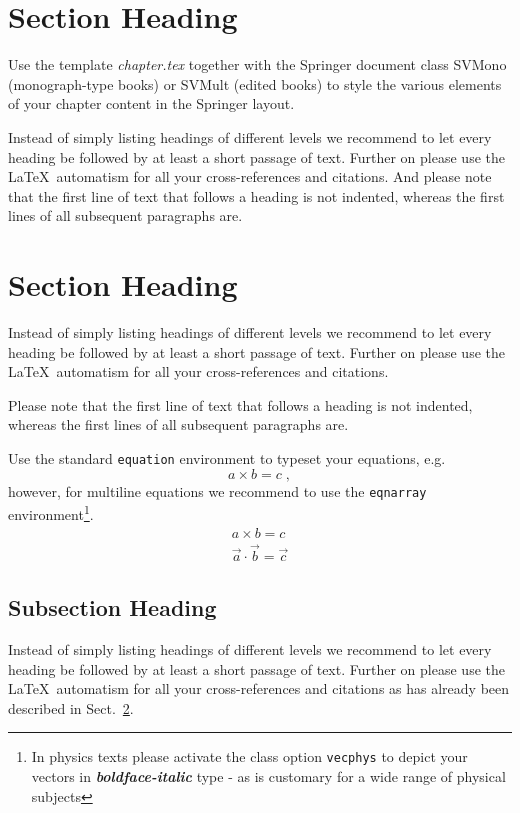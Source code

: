 \documentclass[graybox]{svmult}
\begin{document}
\section{Section Heading}
\label{sec:1}
Use the template \emph{chapter.tex} together with the Springer document class SVMono (monograph-type books) or SVMult (edited books) to style the various elements of your chapter content in the Springer layout.

Instead of simply listing headings of different levels we recommend to
let every heading be followed by at least a short passage of text.
Further on please use the \LaTeX\ automatism for all your
cross-references and citations. And please note that the first line of
text that follows a heading is not indented, whereas the first lines of
all subsequent paragraphs are.

\section{Section Heading}
\label{sec:2}
Instead of simply listing headings of different levels we recommend to
let every heading be followed by at least a short passage of text.
Further on please use the \LaTeX\ automatism for all your
cross-references and citations.

Please note that the first line of text that follows a heading is not indented, whereas the first lines of all subsequent paragraphs are.

Use the standard \verb|equation| environment to typeset your equations, e.g.
%
\begin{equation}
a \times b = c\;,
\end{equation}
%
however, for multiline equations we recommend to use the \verb|eqnarray| environment\footnote{In physics texts please activate the class option \texttt{vecphys} to depict your vectors in \textbf{\itshape boldface-italic} type - as is customary for a wide range of physical subjects}.
\begin{eqnarray}
a \times b = c \nonumber\\
\vec{a} \cdot \vec{b}=\vec{c}
\label{eq:01}
\end{eqnarray}

\subsection{Subsection Heading}
\label{subsec:2}
Instead of simply listing headings of different levels we recommend to
let every heading be followed by at least a short passage of text.
Further on please use the \LaTeX\ automatism for all your
cross-references and citations
as has already been described in Sect.~\ref{sec:2}.
\end{document}
